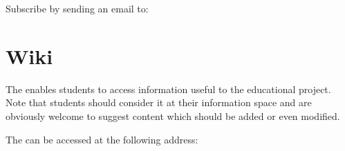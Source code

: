 Subscribe by sending an email to:

\begin{center}
\end{center}

%
%

\section{Wiki}

The  enables students to access information useful to the
 educational project. Note that students should consider it
at their information space and are obviously welcome to suggest content
which should be added or even modified.

The   can be accessed at the following address:

\begin{center}
\end{center}
